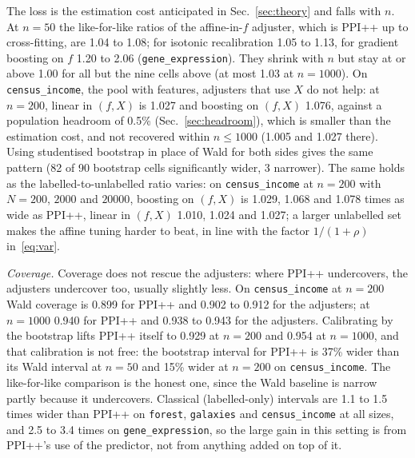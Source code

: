 The loss is the estimation cost anticipated in Sec.~\ref{sec:theory} and falls with $n$. At $n=50$ the like-for-like ratios of the affine-in-$f$ adjuster, which is PPI++ up to cross-fitting, are 1.04 to 1.08;
for isotonic recalibration 1.05 to 1.13, for gradient boosting on $f$ 1.20 to 2.06 (\texttt{gene\_expression}). They shrink with $n$ but stay at or above 1.00 for all but the nine cells above (at most 1.03 at $n=1000$).
On \texttt{census\_income}, the pool with features, adjusters that use $X$ do not help: at $n=200$, linear in $(f,X)$ is 1.027 and boosting on $(f,X)$ 1.076, against a population headroom of 0.5\% (Sec.~\ref{sec:headroom}),
which is smaller than the estimation cost, and not recovered within $n\le1000$ (1.005 and 1.027 there). Using studentised bootstrap in place of Wald for both sides gives the same pattern (82 of 90 bootstrap cells significantly wider, 3 narrower).
The same holds as the labelled-to-unlabelled ratio varies: on \texttt{census\_income} at $n=200$ with $N=200$, $2000$ and $20000$, boosting on $(f,X)$ is 1.029, 1.068 and 1.078 times as wide as PPI++, linear in $(f,X)$ 1.010, 1.024 and 1.027;
a larger unlabelled set makes the affine tuning harder to beat, in line with the factor $1/(1+\rho)$ in~\eqref{eq:var}.

\emph{Coverage.} Coverage does not rescue the adjusters: where PPI++ undercovers, the adjusters undercover too, usually slightly less. On \texttt{census\_income} at $n=200$ Wald coverage is 0.899 for PPI++ and 0.902 to 0.912 for the adjusters;
at $n=1000$ 0.940 for PPI++ and 0.938 to 0.943 for the adjusters. Calibrating by the bootstrap lifts PPI++ itself to 0.929 at $n=200$ and 0.954 at $n=1000$, and that calibration is not free: the bootstrap interval for PPI++ is 37\% wider than its Wald interval at $n=50$ and 15\% wider at $n=200$ on \texttt{census\_income}.
The like-for-like comparison is the honest one, since the Wald baseline is narrow partly because it undercovers.
Classical (labelled-only) intervals are 1.1 to 1.5 times wider than PPI++ on \texttt{forest}, \texttt{galaxies} and \texttt{census\_income} at all sizes, and 2.5 to 3.4 times on \texttt{gene\_expression},
so the large gain in this setting is from PPI++'s use of the predictor, not from anything added on top of it.
